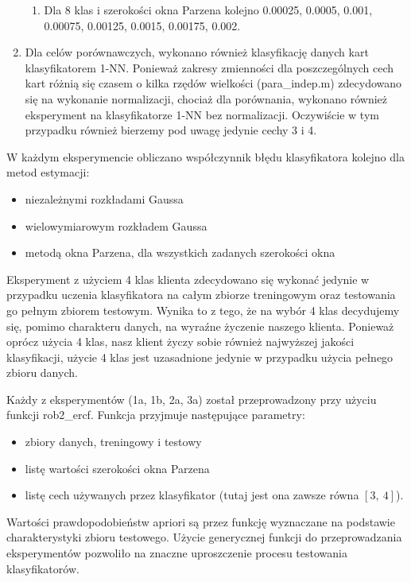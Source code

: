 \documentclass{article}
\begin{document}
\begin{enumerate}
        \begin{enumerate}
        	\item Dla 8 klas i szerokości okna Parzena kolejno 0.00025, 0.0005, 0.001, 0.00075,  0.00125, 0.0015, 0.00175, 0.002.
        \end{enumerate}
	    \item Dla celów porównawczych, wykonano również klasyfikację danych kart klasyfikatorem 1-NN. Ponieważ zakresy zmienności dla poszczególnych cech kart różnią się czasem o kilka rzędów wielkości (para\_indep.m) zdecydowano się na wykonanie normalizacji, chociaż dla porównania, wykonano również eksperyment na klasyfikatorze 1-NN bez normalizacji. Oczywiście w tym przypadku również bierzemy pod uwagę jedynie cechy 3 i 4. 
	\end{enumerate}
	W każdym eksperymencie obliczano współczynnik błędu klasyfikatora kolejno dla metod estymacji:
	\begin{itemize}
		\item niezależnymi rozkładami Gaussa
		\item wielowymiarowym rozkładem Gaussa
		\item metodą okna Parzena, dla wszystkich zadanych szerokości okna
	\end{itemize}
	Eksperyment z użyciem 4 klas klienta zdecydowano się wykonać jedynie w przypadku uczenia klasyfikatora na całym zbiorze treningowym oraz testowania go pełnym zbiorem testowym. Wynika to z tego, że na wybór 4 klas decydujemy się, pomimo charakteru danych, na wyraźne życzenie naszego klienta. Ponieważ oprócz użycia 4 klas, nasz klient życzy sobie również najwyższej jakości klasyfikacji, użycie 4 klas jest uzasadnione jedynie w przypadku użycia pełnego zbioru danych. 
	
	Każdy z eksperymentów (1a, 1b, 2a, 3a) został przeprowadzony przy użyciu funkcji rob2\_ercf. Funkcja przyjmuje następujące parametry:
	\begin{itemize}
		\item zbiory danych, treningowy i testowy
		\item listę wartości szerokości okna Parzena
		\item listę cech używanych przez klasyfikator (tutaj jest ona zawsze równa $[3,\ 4]$). 
	\end{itemize}
	Wartości prawdopodobieństw apriori są przez funkcję wyznaczane na podstawie charakterystyki zbioru testowego. Użycie generycznej funkcji do przeprowadzania eksperymentów pozwoliło na znaczne uproszczenie procesu testowania klasyfikatorów. 
	
\end{document}
